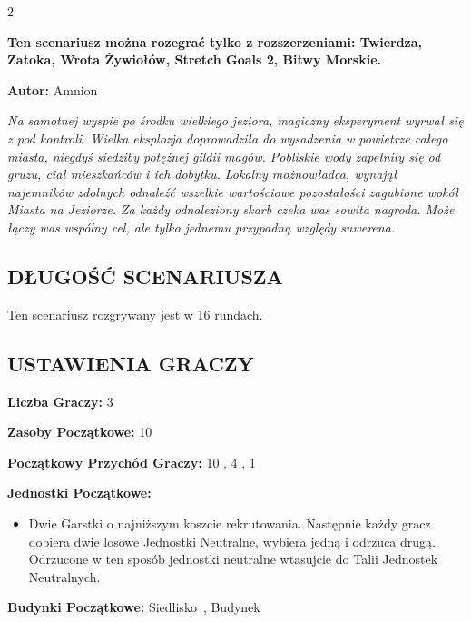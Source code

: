 

\begin{multicols*}{2}

\textbf{Ten scenariusz można rozegrać tylko z rozszerzeniami: Twierdza, Zatoka, Wrota Żywiołów, Stretch Goals 2, Bitwy Morskie.}

\textbf{Autor:} Amnion

\textit{Na samotnej wyspie po środku wielkiego jeziora, magiczny eksperyment wyrwał się z pod kontroli. Wielka eksplozja doprowadziła do wysadzenia w powietrze całego miasta, niegdyś siedziby potężnej gildii magów. Pobliskie wody zapełniły się od gruzu, ciał mieszkańców i ich dobytku. Lokalny możnowładca, wynajął najemników zdolnych odnaleźć wszelkie wartościowe pozostałości zagubione wokół Miasta na Jeziorze. Za każdy odnaleziony skarb czeka was sowita nagroda. Może łączy was wspólny cel, ale tylko jednemu przypadną względy suwerena.}

\subsection*{\MakeUppercase{DŁUGOŚĆ SCENARIUSZA}}

Ten scenariusz rozgrywany jest w 16 rundach.

\subsection*{\MakeUppercase{Ustawienia Graczy}}

\textbf{Liczba Graczy:} 3

\textbf{Zasoby Początkowe:} 10 

\textbf{Początkowy Przychód Graczy:} 10 , 4 , 1 

\textbf{Jednostki Początkowe:}
\begin{itemize}
  \item Dwie Garstki  o najniższym koszcie rekrutowania. Następnie każdy gracz dobiera dwie losowe  Jednostki Neutralne, wybiera jedną i odrzuca drugą. Odrzucone w ten sposób jednostki neutralne wtasujcie do Talii Jednostek Neutralnych.
\end{itemize}

\textbf{Budynki Początkowe:} Siedlisko~, Budynek~


\columnbreak


\end{multicols*}
